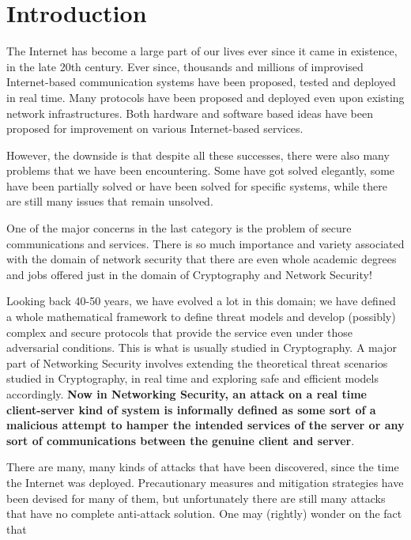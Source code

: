 \documentclass[10pt,twocolumn,letterpaper]{article}
\begin{document}
\section{Introduction}
The Internet has become a large part of our lives ever since it came in existence, in the late 20th century. Ever since, thousands and millions of improvised Internet-based communication systems have been proposed, tested and deployed in real time. Many protocols have been proposed and deployed even upon existing network infrastructures. Both hardware and software based ideas have been proposed for improvement on various Internet-based services. 
\\
\par However, the downside is that despite all these successes, there were also many problems that we have been encountering. Some have got solved elegantly, some have been partially solved or have been solved for specific systems, while there are still many issues that remain unsolved. 
\\
\par One of the major concerns in the last category is the problem of secure communications and services. There is so much importance and variety associated with the domain of network security that there are even whole academic degrees and jobs offered just in the domain of Cryptography and Network Security!
\\
\par Looking back 40-50 years, we have evolved a lot in this domain; we have defined a whole mathematical framework to define threat models and develop (possibly) complex and secure protocols that provide the service even under those adversarial conditions. This is what is usually studied in Cryptography.
A major part of Networking Security involves extending the theoretical threat scenarios studied in Cryptography, in real time and exploring safe and efficient models accordingly. \textbf{Now in Networking Security, an attack on a real time client-server kind of system is informally defined as some sort of a malicious attempt to hamper the intended services of the server or any sort of communications between the genuine client and server}. 
\\
\par There are many, many kinds of attacks that have been discovered, since the time the Internet was deployed. Precautionary measures and mitigation strategies have been devised for many of them, but unfortunately there are still many attacks that have no complete anti-attack solution. One may (rightly) wonder on the fact that 
\end{document}
